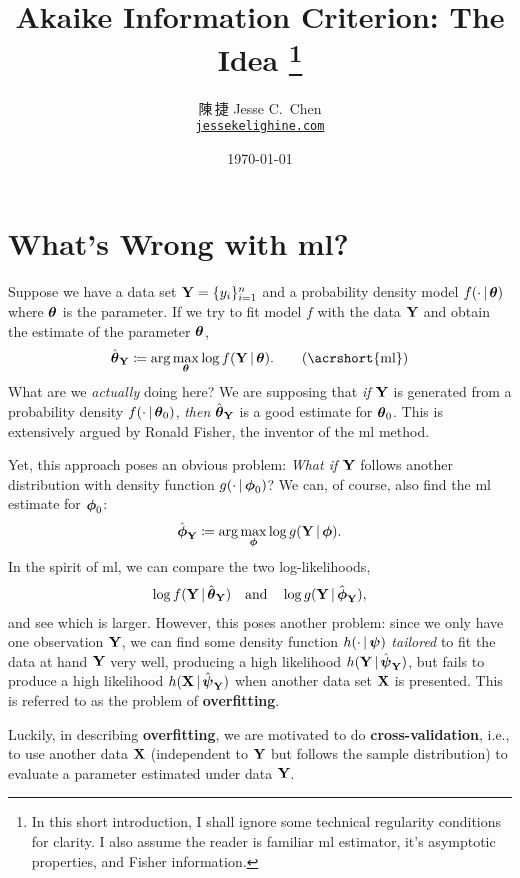 \documentclass[a4paper]{article}
\title{Akaike Information Criterion: The Idea%
\footnote{In this short introduction, I shall ignore some technical regularity conditions for clarity.
I also assume the reader is familiar \acrshort{ml} estimator, it's asymptotic properties, and Fisher information.}}
\author{陳\,捷 Jesse C.\ Chen\\\texttt{\href{https://jessekelighine.com}{jessekelighine.com}}}
\date{\today}
\begin{document}
\maketitle

\section{What's Wrong with \texorpdfstring{\acrlong{ml}}{Maximum Likelihood}?}

\noindent
Suppose we have a data set $\mathbf{Y}=\{y_{i}\}_{i=1}^n$ and a probability density model $f(\cdot\,|\,\boldsymbol{\theta})$ where $\boldsymbol{\theta}$ is the parameter.
If we try to fit model $f$ with the data $\mathbf{Y}$ and obtain the estimate of the parameter $\boldsymbol{\theta}$,
\begin{align}
	\hat\ttheta_{\YY} \coloneqq \arg\max_{\ttheta} \log f(\YY\given\ttheta). \tag{\acrshort{ml}}
\end{align}
What are we \emph{actually} doing here?
We are supposing that \emph{if} $\mathbf{Y}$ is generated from a probability density $f(\cdot\,|\,\boldsymbol{\theta}_{0})$,
\emph{then} $\hat{\boldsymbol{\theta}}_{\mathbf{Y}}$ is a good estimate for $\boldsymbol{\theta}_{0}$.
This is extensively argued by Ronald Fisher, the inventor of the \acrlong{ml} method.

Yet, this approach poses an obvious problem:
\emph{What if} $\mathbf{Y}$ follows another distribution with density function $g(\cdot\,|\,\boldsymbol{\phi}_{0})$?
We can, of course, also find the \acrshort{ml} estimate for $\boldsymbol{\phi}_{0}$:
\begin{align*}
	\hat{\boldsymbol{\phi}}_{\mathbf{Y}} \coloneqq \arg\max_{\boldsymbol{\phi}} \log g(\mathbf{Y}\,|\,\boldsymbol{\phi}).
\end{align*}
In the spirit of \acrshort{ml},
we can compare the two log-likelihoods,
\begin{align}\label{eq:ml-compare}
	\log f(\mathbf{Y}\,|\,\hat{\boldsymbol{\theta}}_{\mathbf{Y}})
	\quad\text{and}\quad
	\log g(\mathbf{Y}\,|\,\hat{\boldsymbol{\phi}}_{\mathbf{Y}}),
\end{align}
and see which is larger.
However, this poses another problem:
since we only have one observation $\mathbf{Y}$,
we can find some density function $h(\cdot\,|\,\boldsymbol{\psi})$ \emph{tailored} to fit the data at hand $\mathbf{Y}$ very well,
producing a high likelihood $h(\mathbf{Y}\,|\,\hat{\boldsymbol{\psi}}_{\mathbf{Y}})$,
but fails to produce a high likelihood $h(\mathbf{X}\,|\,\hat{\boldsymbol{\psi}}_{\mathbf{Y}})$ when another data set $\mathbf{X}$ is presented.
This is referred to as the problem of \textbf{overfitting}.

Luckily,
in describing \textbf{overfitting},
we are motivated to do \textbf{cross-validation},
i.e., to use another data $\mathbf{X}$ (independent to $\mathbf{Y}$ but follows the sample distribution)
to evaluate a parameter estimated under data $\mathbf{Y}$.
\end{document}
